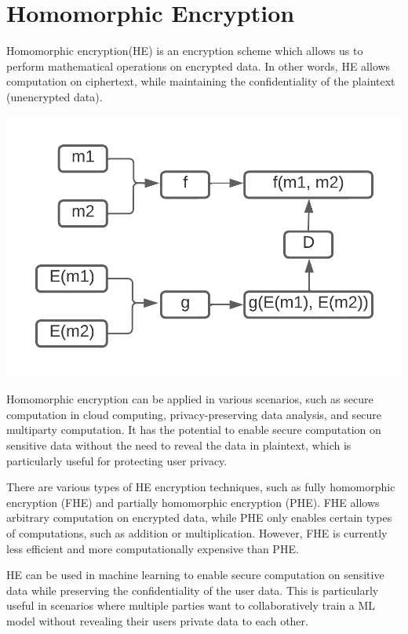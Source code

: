 \documentclass{article}
\begin{document}
\section{Homomorphic Encryption}

\noindent Homomorphic encryption(HE) is an encryption scheme which allows us to perform mathematical operations on encrypted data. In other words, HE allows computation on ciphertext, while maintaining the confidentiality of the plaintext (unencrypted data).

\begin{center}
    \includegraphics{Homomorphic2.png}
\end{center}

\noindent Homomorphic encryption can be applied in various scenarios, such as secure computation in cloud computing, privacy-preserving data analysis, and secure multiparty computation. It has the potential to enable secure computation on sensitive data without the need to reveal the data in plaintext, which is particularly useful for protecting user privacy.

\noindent There are various types of HE encryption techniques, such as fully homomorphic encryption (FHE) and partially homomorphic encryption (PHE). FHE allows arbitrary computation on encrypted data, while PHE only enables certain types of computations, such as addition or multiplication. However, FHE is currently less efficient and more computationally expensive than PHE.

\noindent HE can be used in machine learning to enable secure computation on sensitive data while preserving the confidentiality of the user data. This is particularly useful in scenarios where multiple parties want to collaboratively train a ML model without revealing their users private data to each other.
\end{document}
